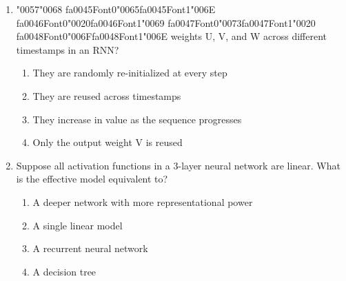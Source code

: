 \documentclass[12pt]{article}
\begin{document}
\begin{enumerate}[label=Q\arabic*.]
\begin{enumerate}[label=(\Alph*)]
    \item To update weights based on the loss
    \item To calculate the predicted output and compute the loss
    \item To unroll the network into a sequence
    \item To calculate the gradient for each parameter
\end{enumerate}
\item {\char"0057}{\char"0068} {\csname fa0045Font0\endcsname\char"0065}{\csname fa0045Font1\endcsname\char"006E} {\csname fa0046Font0\endcsname\char"0020}{\csname fa0046Font1\endcsname\char"0069} {\csname fa0047Font0\endcsname\char"0073}{\csname fa0047Font1\endcsname\char"0020} {\csname fa0048Font0\endcsname\char"006F}{\csname fa0048Font1\endcsname\char"006E} weights U, V, and W across different timestamps in an RNN?
\begin{enumerate}[label=(\Alph*)]
    \item They are randomly re-initialized at every step
    \item They are reused across timestamps
    \item They increase in value as the sequence progresses
    \item Only the output weight V is reused
\end{enumerate}
\item Suppose all activation functions in a 3-layer neural network are linear. What is the effective model equivalent to?
\begin{enumerate}[label=(\Alph*)]
    \item A deeper network with more representational power
    \item A single linear model
    \item A recurrent neural network
    \item A decision tree
\end{enumerate}

\end{enumerate}
\end{document}
